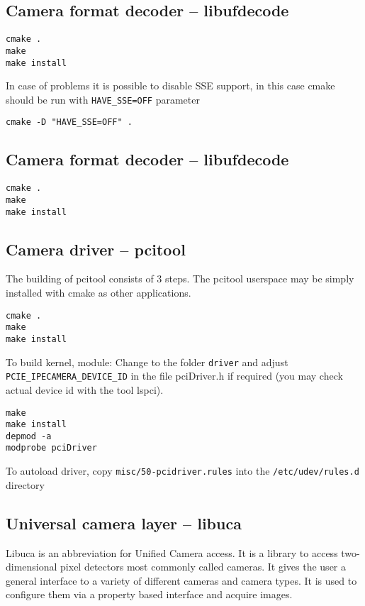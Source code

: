 \subsection{Camera format decoder -- libufdecode}
\begin{verbatim}
cmake .
make 
make install
\end{verbatim}


In case of problems it is possible to disable SSE support, in this case cmake should be run with \verb/HAVE_SSE=OFF/ parameter
\begin{verbatim}
cmake -D "HAVE_SSE=OFF" .
\end{verbatim}


\subsection{Camera format decoder -- libufdecode}
\begin{verbatim}
cmake .
make 
make install
\end{verbatim}


\subsection{Camera driver -- pcitool}
The building of pcitool consists of 3 steps. The pcitool userspace may be simply installed with cmake as other applications.
\begin{verbatim}
cmake .
make
make install
\end{verbatim}

To build kernel, module:
Change to the folder \verb/driver/ and adjust  \verb/PCIE_IPECAMERA_DEVICE_ID/ in the file pciDriver.h if required (you may check actual device id with the tool lspci).
\begin{verbatim}
make
make install
depmod -a
modprobe pciDriver
\end{verbatim}
To autoload driver, copy \verb|misc/50-pcidriver.rules| into the \verb|/etc/udev/rules.d| directory



\subsection{Universal camera layer -- libuca}

Libuca is an abbreviation for Unified Camera access. It is a library to access two-dimensional pixel detectors most commonly called cameras. It gives the user a general interface to a variety of different cameras and camera types. It is used to configure them via a property based
interface and acquire images.

